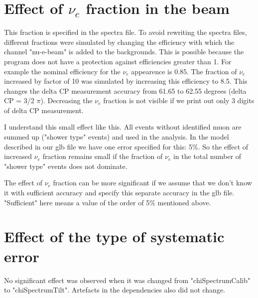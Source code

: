 \documentclass[prd,showpacs,groupedaddress,superscriptaddress,amsmath,amssymb]{revtex4-2} %
\begin{document}
\section{Effect of $\nu_e$ fraction in the beam}


This fraction is specified in the spectra file. To avoid rewriting the spectra files, different fractions were simulated by changing the efficiency
with which the channel "nu-e-beam" is added to the backgrounds. This is possible because the program does not have a protection against efficiencies
greater than 1. For example the nominal efficiency for the $\nu_e$ appearence is 0.85. The fraction of $\nu_e$ increased by factor of 10 was
simulated by increasing this efficiency to 8.5. This changes the delta CP measurement accuracy from 61.65 to 62.55 degrees (delta CP = 3/2 $\pi$).
Decreasing the $\nu_e$ fraction is not visible if we print out only 3 digits of delta CP measurement.

I understand this small effect like this. All events without identified muon are summed up ("shower type" events) and used in the analysis. In the model
described in our glb file we have one error specified for this: 5\%. So the effect of increased $\nu_e$ fraction remains small if the fraction of $\nu_e$
in the total number of "shower type" events does not dominate.

The effect of $\nu_e$ fraction can be more significant if we assume that we don't know it with sufficient accuracy and specify this separate accuracy
in the glb file. "Sufficient" here means a value of the order of 5\% mentioned above.


\section{Effect of the type of systematic error}


No significant effect was observed when it was changed from "chiSpectrumCalib" to "chiSpectrumTilt". Artefacts in the dependencies also did not change.



\clearpage


\end{document}
